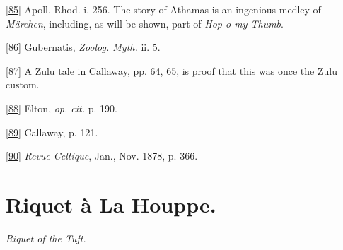 \documentclass[14pt,a4paper]{memoir}
\begin{document}
\protect\hypertarget{4533318093929944247_33931-h-1.htm.xhtmlux5cux23Footnote_85}{}{}\protect\hyperlink{4533318093929944247_33931-h-1.htm.xhtmlux5cux23FNanchor_85}{{{[}85{]}}}
Apoll. Rhod. i. 256. The story of Athamas is an ingenious medley of
\emph{Märchen}, including, as will be shown, part of \emph{Hop
o\textquotesingle{} my Thumb}.

\protect\hypertarget{4533318093929944247_33931-h-1.htm.xhtmlux5cux23Footnote_86}{}{}\protect\hyperlink{4533318093929944247_33931-h-1.htm.xhtmlux5cux23FNanchor_86}{{{[}86{]}}}
Gubernatis, \emph{Zoolog. Myth.} ii. 5.

\protect\hypertarget{4533318093929944247_33931-h-1.htm.xhtmlux5cux23Footnote_87}{}{}\protect\hyperlink{4533318093929944247_33931-h-1.htm.xhtmlux5cux23FNanchor_87}{{{[}87{]}}}
A Zulu tale in Callaway, pp. 64, 65, is proof that this was once the
Zulu custom.

\protect\hypertarget{4533318093929944247_33931-h-1.htm.xhtmlux5cux23Footnote_88}{}{}\protect\hyperlink{4533318093929944247_33931-h-1.htm.xhtmlux5cux23FNanchor_88}{{{[}88{]}}}
Elton, \emph{op. cit.} p. 190.

\protect\hypertarget{4533318093929944247_33931-h-1.htm.xhtmlux5cux23Footnote_89}{}{}\protect\hyperlink{4533318093929944247_33931-h-1.htm.xhtmlux5cux23FNanchor_89}{{{[}89{]}}}
Callaway, p. 121.

\protect\hypertarget{4533318093929944247_33931-h-1.htm.xhtmlux5cux23Footnote_90}{}{}\protect\hyperlink{4533318093929944247_33931-h-1.htm.xhtmlux5cux23FNanchor_90}{{{[}90{]}}}
\emph{Revue Celtique}, Jan., Nov. 1878, p. 366.

\section{Riquet à La Houppe.}

\emph{Riquet of the Tuft.} \\
\end{document}
